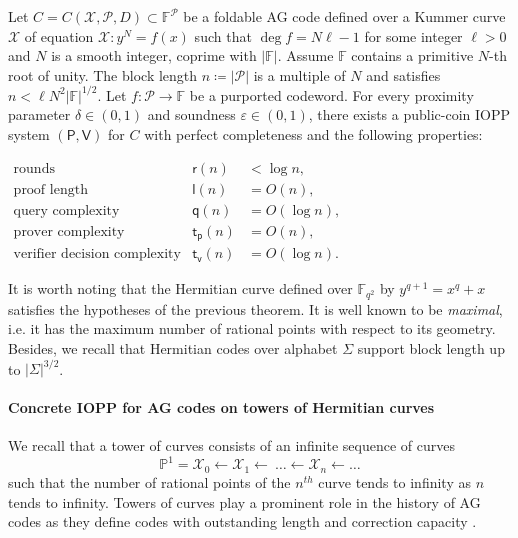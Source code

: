 \documentclass[10pt,a4paper]{article}
\renewcommand\epsilon{\varepsilon}
\newcommand\F{\mathbb{F}}
\newcommand\PP{\mathbb{P}}
\newcommand\prover{\mathsf{P}}
\newcommand\verifier{\mathsf{V}}
\newcommand{\size}[1]{\left|#1\right|}
\newcommand\calX{\mathcal{X}}
\newcommand\calP{\mathcal{P}}
\newcommand\mydef{\coloneqq}
\theoremstyle{plain}
\theoremstyle{plain}
\theoremstyle{definition}
\theoremstyle{remark}
\theoremstyle{plain}
\begin{document}
\begin{theorem}\label{thm:intro-kummer} Let ${C = C(\calX, \calP, D)} \subset \F^{\calP}$ be a foldable AG code defined over a Kummer curve $\calX$  of equation $\calX : y^N = f(x)$ such that $\deg f= N \ell -1$ for some integer $\ell >0$ and $N$ is a smooth integer, coprime with $\size{\F}$.    Assume $\F$ contains a primitive $N$-th root of unity. 
	The block length $n \mydef \size{\calP}$ is a multiple of $N$ and satisfies $n < \ell N^2\size{\F}^{1/2}$.
	Let $f : \calP \rightarrow \F$ be a purported codeword. For every proximity parameter $\delta \in (0, 1)$ and soundness $\epsilon \in (0,1)$, there exists a public-coin IOPP system $(\prover, \verifier)$ for $C$ with perfect completeness and the following properties:
	
	$
	\begin{array}{lll}
		\text{rounds} &\mathsf{r}(n) &< \log n,\\
		\text{proof length} &\mathsf{l}(n) &= O(n),\\
		\text{query complexity} &\mathsf{q}(n) &= O(\log n),\\
		\text{prover complexity} &\mathsf{t_p}(n) &= O(n),\\
		\text{verifier decision complexity} & \mathsf{t_v}(n) &= O(\log n).
	\end{array}
	$
\end{theorem}

It is worth noting that the Hermitian curve defined over $\F_{q^2}$ by $y^{q+1}=x^q+x$ satisfies the hypotheses of the previous theorem. It is well known to be \emph{maximal}, i.e. it has the maximum number of rational points with respect to its geometry. Besides, we recall that Hermitian codes over alphabet $\Sigma$ support block length up to $\size \Sigma^{3/2}$.

\paragraph*{Concrete IOPP for AG codes on towers of Hermitian curves}
We recall that a tower of curves consists of an infinite sequence of curves 
\[\PP^1 = \calX_0\gets\calX_1\gets\ \ldots\gets\calX_n\gets\ldots\]
such that the number of rational points of the $n^{th}$ curve tends to infinity as $n$ tends to infinity. Towers of curves play a prominent role in the history of AG codes as they define codes with outstanding length and correction capacity \cite{TVZ82,BBGS14}. 
\end{document}
